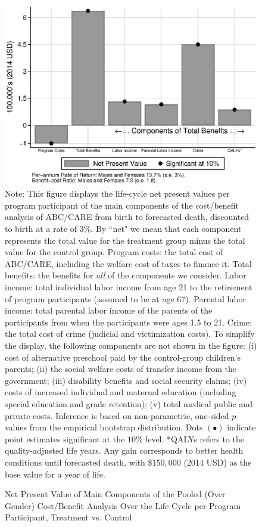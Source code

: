 \begin{figure}
\caption{Net Present Value of Main Components of the Pooled (Over Gender) Cost/Benefit Analysis Over the Life Cycle per Program Participant, Treatment vs. Control}\label{figure:main}
\centering
\includegraphics[width=.7\columnwidth]{output/abccare_npvssummredux.eps}
\footnotesize \justify
Note: This figure displays the life-cycle net present values per program participant of the main components of the cost/benefit analysis of ABC/CARE from birth to forecasted death, discounted to birth at a rate of 3\%. By ``net" we mean that each component represents the total value for the treatment group minus the total value for the control group. Program costs: the total cost of ABC/CARE, including the welfare cost of taxes to finance it. Total benefits: the benefits for \textit{all} of the components we consider. Labor income: total individual labor income from age 21 to the retirement of program participants (assumed to be at age 67). Parental labor income: total parental labor income of the parents of the participants from when the participants were ages 1.5 to 21. Crime: the total cost of crime (judicial and victimization costs). To simplify the display, the following components are not shown in the figure: (i) cost of alternative preschool paid by the control-group children's parents; (ii) the social welfare costs of transfer income from the government; (iii) disability benefits and social security claims; (iv) costs of increased individual and maternal education (including special education and grade retention); (v) total medical public and private costs. Inference is based on non-parametric, one-sided $p$-values from the empirical bootstrap distribution. Dots $(\bullet)$ indicate point estimates significant at the $10\%$ level.
*QALYs refers to the quality-adjusted life years. Any gain corresponds to better health conditions until forecasted death, with $\$150,000$ (2014 USD) as the base value for a year of life.
\end{figure}

